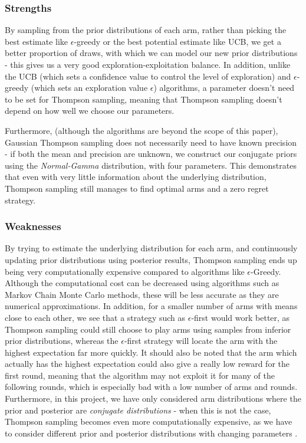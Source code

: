 \subsubsection{Strengths}
By sampling from the prior distributions of each arm, rather than picking the best estimate like $\epsilon$-greedy or the best potential estimate like UCB, we get a better proportion of draws, with which we can model our new prior distributions - this gives us a very good exploration-exploitation balance. In addition, unlike the UCB (which sets a confidence value to control the level of exploration) and $\epsilon$-greedy (which sets an exploration value $\epsilon$) algorithms, a parameter doesn't need to be set for Thompson sampling, meaning that Thompson sampling doesn't depend on how well we choose our parameters. 

Furthermore, (although the algorithms are beyond the scope of this paper), Gaussian Thompson sampling does not necessarily need to have known precision - if both the mean and precision are unknown, we construct our conjugate priors using the \emph{Normal-Gamma} distribution, with four parameters. This demonstrates that even with very little information about the underlying distribution, Thompson sampling still manages to find optimal arms and a zero regret strategy. 

\subsubsection{Weaknesses}
By trying to estimate the underlying distribution for each arm, and continuously updating prior distributions using posterior results, Thompson sampling ends up being very computationally expensive compared to algorithms like $\epsilon$-Greedy. \citep{mazumdar2020thompson} Although the computational cost can be decreased using algorithms such as Markov Chain Monte Carlo methods, these will be less accurate as they are numerical approximations. \citep{mazumdar2020thompson} In addition, for a smaller number of arms with means close to each other, we see that a strategy such as $\epsilon$-first would work better, as Thompson sampling could still choose to play arms using samples from inferior prior distributions, whereas the $\epsilon$-first strategy will locate the arm with the highest expectation far more quickly. It should also be noted that the arm which actually has the highest expectation could also give a really low reward for the first round, meaning that the algorithm may not exploit it for many of the following rounds, which is especially bad with a low number of arms and rounds. Furthermore, in this project, we have only considered arm distributions where the prior and posterior are \emph{conjugate distributions} - when this is not the case, Thompson sampling becomes even more computationally expensive, as we have to consider different prior and posterior distributions with changing parameters \citep{zhou2018racing}.

